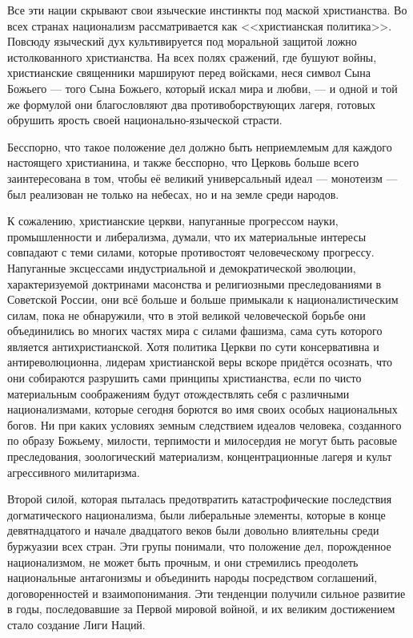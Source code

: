 \sloppy Все эти нации скрывают свои языческие инстинкты под маской христианства. Во всех странах национализм рассматривается как <<христианская политика>>. Повсюду языческий дух культивируется под моральной защитой ложно истолкованного христианства. На всех полях сражений, где бушуют войны, христианские священники маршируют перед войсками, неся символ Сына Божьего — того Сына Божьего, который искал мира и любви, — и одной и той же формулой они благословляют два противоборствующих лагеря, готовых обрушить ярость своей национально-языческой страсти.

Бесспорно, что такое положение дел должно быть неприемлемым для каждого настоящего христианина, и также бесспорно, что Церковь больше всего заинтересована в том, чтобы её великий универсальный идеал — монотеизм — был реализован не только на небесах, но и на земле среди народов.

К сожалению, христианские церкви, напуганные прогрессом науки, промышленности и либерализма, думали, что их материальные интересы совпадают с теми силами, которые противостоят человеческому прогрессу. Напуганные эксцессами индустриальной и демократической эволюции, характеризуемой доктринами масонства и религиозными преследованиями в Советской России, они всё больше и больше примыкали к националистическим силам, пока не обнаружили, что в этой великой человеческой борьбе они объединились во многих частях мира с силами фашизма, сама суть которого является антихристианской. Хотя политика Церкви по сути консервативна и антиреволюционна, лидерам христианской веры вскоре придётся осознать, что они собираются разрушить сами принципы христианства, если по чисто материальным соображениям будут отождествлять себя с различными национализмами, которые сегодня борются во имя своих особых национальных богов. Ни при каких условиях земным следствием идеалов человека, созданного по образу Божьему, милости, терпимости и милосердия не могут быть расовые преследования, зоологический материализм, концентрационные лагеря и культ агрессивного милитаризма.

Второй силой, которая пыталась предотвратить катастрофические последствия догматического национализма, были либеральные элементы, которые в конце девятнадцатого и начале двадцатого веков были довольно влиятельны среди буржуазии всех стран. Эти групы понимали, что положение дел, порожденное национализмом, не может быть прочным, и они стремились преодолеть национальные антагонизмы и объединить народы посредством соглашений, договоренностей и взаимопонимания. Эти тенденции получили сильное развитие в годы, последовавшие за Первой мировой войной, и их великим достижением стало создание Лиги Наций.


